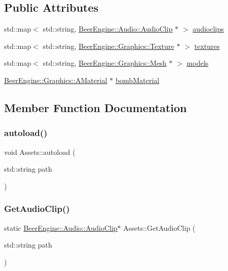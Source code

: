 \subsection*{Public Attributes}
\begin{DoxyCompactItemize}
\item 
std\+::map$<$ std\+::string, \mbox{\hyperlink{class_beer_engine_1_1_audio_1_1_audio_clip}{Beer\+Engine\+::\+Audio\+::\+Audio\+Clip}} $\ast$ $>$ \mbox{\hyperlink{class_assets_a74f01d64e94c8e26e8187d189cd018dc}{audioclips}}
\item 
std\+::map$<$ std\+::string, \mbox{\hyperlink{class_beer_engine_1_1_graphics_1_1_texture}{Beer\+Engine\+::\+Graphics\+::\+Texture}} $\ast$ $>$ \mbox{\hyperlink{class_assets_a973029267b9ab6da8c326f2f7b1404c2}{textures}}
\item 
std\+::map$<$ std\+::string, \mbox{\hyperlink{class_beer_engine_1_1_graphics_1_1_mesh}{Beer\+Engine\+::\+Graphics\+::\+Mesh}} $\ast$ $>$ \mbox{\hyperlink{class_assets_a83d7f0d79376b56cf2c3ca78d4f01df4}{models}}
\item 
\mbox{\hyperlink{class_beer_engine_1_1_graphics_1_1_a_material}{Beer\+Engine\+::\+Graphics\+::\+A\+Material}} $\ast$ \mbox{\hyperlink{class_assets_a3888adb2654159b9791da38233467632}{bomb\+Material}}
\end{DoxyCompactItemize}


\subsection{Member Function Documentation}
\mbox{\label{class_assets_a4e848364b8e24434ec5be20c28106dbd}} 
\subsubsection{\texorpdfstring{autoload()}{autoload()}}
{\footnotesize\ttfamily void Assets\+::autoload (\begin{DoxyParamCaption}\item[{std\+::string}]{path }\end{DoxyParamCaption})}

\mbox{\label{class_assets_a8f344169002807c95cb543d1116ea2bb}} 
\subsubsection{\texorpdfstring{Get\+Audio\+Clip()}{GetAudioClip()}}
{\footnotesize\ttfamily static \mbox{\hyperlink{class_beer_engine_1_1_audio_1_1_audio_clip}{Beer\+Engine\+::\+Audio\+::\+Audio\+Clip}}$\ast$ Assets\+::\+Get\+Audio\+Clip (\begin{DoxyParamCaption}\item[{std\+::string}]{path }\end{DoxyParamCaption})\hspace{0.3cm}{\ttfamily [static]}}

